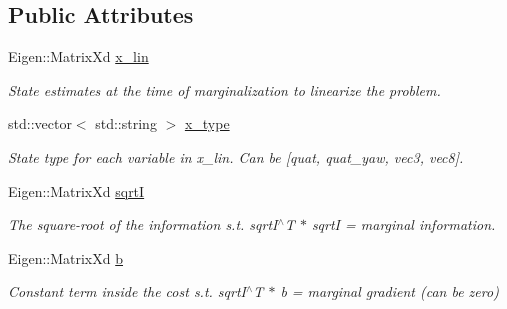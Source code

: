 \subsection*{Public Attributes}
\begin{DoxyCompactItemize}
\item 
\mbox{\label{classov__init_1_1Factor__GenericPrior_a11eeaebe7c7e965fde10be9822c858d1}} 
Eigen\+::\+Matrix\+Xd \hyperlink{classov__init_1_1Factor__GenericPrior_a11eeaebe7c7e965fde10be9822c858d1}{x\+\_\+lin}
\begin{DoxyCompactList}\small\item\em State estimates at the time of marginalization to linearize the problem. \end{DoxyCompactList}\item 
\mbox{\label{classov__init_1_1Factor__GenericPrior_a9ab293a4952b242f6455d5b5178e5ca1}} 
std\+::vector$<$ std\+::string $>$ \hyperlink{classov__init_1_1Factor__GenericPrior_a9ab293a4952b242f6455d5b5178e5ca1}{x\+\_\+type}
\begin{DoxyCompactList}\small\item\em State type for each variable in x\+\_\+lin. Can be \mbox{[}quat, quat\+\_\+yaw, vec3, vec8\mbox{]}. \end{DoxyCompactList}\item 
\mbox{\label{classov__init_1_1Factor__GenericPrior_ac91a3c87710a7a48f5ebb4f32554d3b7}} 
Eigen\+::\+Matrix\+Xd \hyperlink{classov__init_1_1Factor__GenericPrior_ac91a3c87710a7a48f5ebb4f32554d3b7}{sqrtI}
\begin{DoxyCompactList}\small\item\em The square-\/root of the information s.\+t. sqrt\+I$^\wedge$T $\ast$ sqrtI = marginal information. \end{DoxyCompactList}\item 
\mbox{\label{classov__init_1_1Factor__GenericPrior_a9a3a5b2873e14ccec67e01a8cd57a755}} 
Eigen\+::\+Matrix\+Xd \hyperlink{classov__init_1_1Factor__GenericPrior_a9a3a5b2873e14ccec67e01a8cd57a755}{b}
\begin{DoxyCompactList}\small\item\em Constant term inside the cost s.\+t. sqrt\+I$^\wedge$T $\ast$ b = marginal gradient (can be zero) \end{DoxyCompactList}\end{DoxyCompactItemize}


